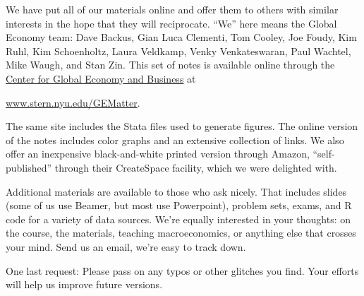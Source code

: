 We have put all of our materials online
and offer them to others with similar interests in the hope
that they will reciprocate.
``We'' here means the Global Economy team:
Dave Backus, Gian Luca Clementi, Tom Cooley, Joe Foudy, Kim Ruhl, Kim Schoenholtz,
Laura Veldkamp, Venky Venkateswaran, Paul Wachtel, Mike Waugh, and Stan Zin.
This set of notes is available online
through the
\href{http://www.stern.nyu.edu/experience-stern/about/departments-centers-initiatives/centers-of-research/global-economy-business/index.htm}
{Center for Global Economy and Business}
at

\vspace*{\parskip}
\centerline{\url{www.stern.nyu.edu/GEMatter}.}

The same site includes the Stata files used to generate figures.
The online version of the notes includes color graphs
and an extensive collection of links.
We also offer an inexpensive black-and-white printed version through Amazon,
``self-published'' through their CreateSpace facility,
which we were delighted with.

Additional materials are available to those who ask nicely.
That includes slides (some of us use Beamer, but most use Powerpoint),
problem sets, exams, and R code for a variety of data sources.
We're equally interested in your thoughts:  on the course,
the materials, teaching macroeconomics, or anything else that crosses
your mind.
Send us an email, we're easy to track down.

One last request:  Please pass on any typos or other glitches you find.
Your efforts will help us improve future versions.

